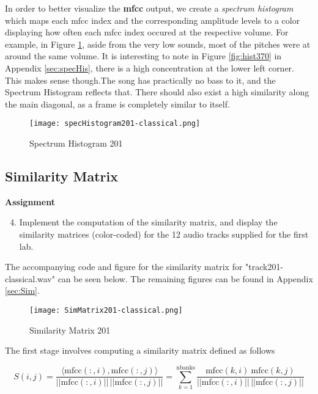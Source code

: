 \documentclass{article} %
\begin{document}


In order to better visualize the \textbf{mfcc} output, we create a \emph{spectrum histogram} which maps each mfcc index and the corresponding amplitude levels
to a color displaying how often each mfcc index occured at the respective volume. For example, in Figure \ref{fig:hist201_1}, aside from the very low sounds, most
of the pitches were at around the same volume. It is interesting to note in Figure \ref{fig:hist370} in Appendix \ref{sec:specHis}, 
there is a high concentration at the lower left corner. This makes sense though.The song has practically no bass to it, and the Spectrum Histogram reflects that. 
There should also exist a high similarity along the main diagonal, as a frame is completely similar to itself. 

\begin{figure}[H]
\centering
\texttt{[image: specHistogram201-classical.png]}
\caption{Spectrum Histogram 201}
\label{fig:hist201_1}
\end{figure}

\subsection{Similarity Matrix}
\begin{framed}
\textbf{Assignment}
\begin{enumerate}
\setcounter{enumi}{3}
\item Implement the computation of the similarity matrix, and display the similarity matrices (color-coded) for the 12 audio tracks supplied for the first lab. 
\end{enumerate}
\end{framed}

The accompanying code and figure for the similarity matrix for "track201-classical.wav" can be seen below. The remaining figures can be found in Appendix \ref{sec:Sim}.



\begin{figure}[H]
\centering
\texttt{[image: SimMatrix201-classical.png]}
\caption{Similarity Matrix 201}
\label{fig:sim201}
\end{figure}

The first stage involves computing a similarity matrix defined as follows

\begin{equation}
\label{eq:sim}
S(i,j) = \frac{\langle \text{mfcc}(:,i), \text{mfcc}(:,j) \rangle }{||\text{mfcc}(:,i) || \,  ||\text{mfcc}(:,j) ||} = 
\sum\limits_{k=1}^{\text{nbanks}} \frac{\text{mfcc}(k,i)\  \text{mfcc}(k,j)}{||\text{mfcc}(:,i) || \,  ||\text{mfcc}(:,j) ||}
\end{equation}
\end{document}
